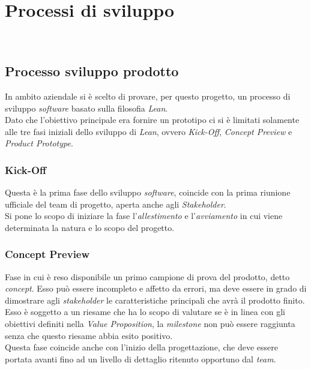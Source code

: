 
\chapter{Processi di sviluppo}
\label{cap:processi-metodologie}

\\

\section{Processo sviluppo prodotto}
In ambito aziendale si è scelto di provare, per questo progetto, un processo di sviluppo \emph{software} basato sulla filosofia \emph{Lean}.\\
Dato che l'obiettivo principale era fornire un prototipo ci si è limitati solamente alle tre fasi iniziali dello sviluppo di \emph{Lean}, ovvero \emph{Kick-Off}, \emph{Concept Preview} e \emph{Product Prototype}.


\subsection{Kick-Off}
Questa è la prima fase dello sviluppo \emph{software}, coincide con la prima riunione ufficiale del team di progetto, aperta anche agli \emph{Stakeholder}.\\
Si pone lo scopo di iniziare la fase l'\emph{allestimento} e l'\emph{avviamento} in cui viene determinata la natura e lo scopo del progetto.\\

\subsection{Concept Preview}
Fase in cui è reso disponibile un primo campione di prova del prodotto, detto \emph{concept}. Esso può essere incompleto e affetto da errori, ma deve essere in grado di dimostrare agli \emph{stakeholder} le caratteristiche principali che avrà il prodotto finito.\\
Esso è soggetto a un riesame che ha lo scopo di valutare se è in linea con gli obiettivi definiti nella \emph{Value Proposition}, la \emph{milestone} non può essere raggiunta senza che questo riesame abbia esito positivo.\\
Questa fase coincide anche con l'inizio della progettazione, che deve essere portata avanti fino ad un livello di dettaglio ritenuto opportuno dal \emph{team}.\\

